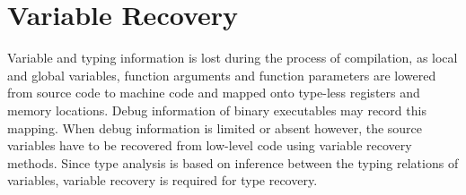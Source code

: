 
\section{Variable Recovery}
\label{sec:variable_recovery}

Variable and typing information is lost during the process of compilation, as local and global variables, function arguments and function parameters are lowered from source code to machine code and mapped onto type-less registers and memory locations. Debug information of binary executables may record this mapping. When debug information is limited or absent however, the source variables have to be recovered from low-level code using variable recovery methods. Since type analysis is based on inference between the typing relations of variables, variable recovery is required for type recovery.



%

